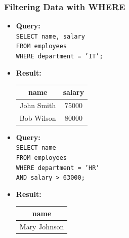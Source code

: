 \documentclass[10pt]{beamer}
\begin{document}
\begin{frame}[fragile]
  \frametitle{Filtering Data with WHERE}
  \begin{itemize}
    \item \textbf{Query:} \\
    \texttt{SELECT name, salary} \\
    \texttt{FROM employees} \\
    \texttt{WHERE department = 'IT';}
    
    \item \textbf{Result:}
    \begin{center}
      \begin{tabular}{|c|c|}
        \hline
        \textbf{name} & \textbf{salary} \\
        \hline
        John Smith & 75000 \\
        Bob Wilson & 80000 \\
        \hline
      \end{tabular}
    \end{center}
  \end{itemize}
  
  \vspace{0.5em}
  \begin{itemize}
    \item \textbf{Query:} \\
    \texttt{SELECT name} \\
    \texttt{FROM employees} \\
    \texttt{WHERE department = 'HR'} \\
    \texttt{AND salary > 63000;}
    
    \item \textbf{Result:}
    \begin{center}
      \begin{tabular}{|c|}
        \hline
        \textbf{name} \\
        \hline
        Mary Johnson \\
        \hline
      \end{tabular}
    \end{center}
  \end{itemize}
\end{frame}
\end{document}
